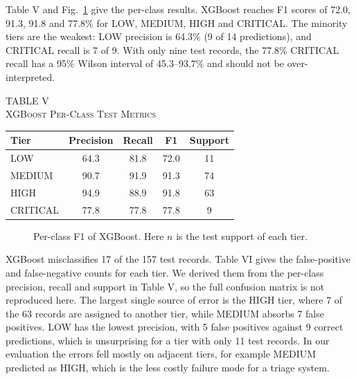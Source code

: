 \documentclass[10pt,twocolumn]{article}
\newcommand{\tcap}[2]{\begin{center}\footnotesize TABLE #1\\[1pt]\scshape #2\end{center}\vspace{-8pt}}
\newcommand{\tnote}[1]{\par\vspace{2pt}{\footnotesize #1\par}}
\begin{document}
Table V and Fig.~\ref{fig:perclass} give the per-class results. XGBoost reaches F1 scores of 72.0, 91.3, 91.8 and 77.8\% for LOW, MEDIUM, HIGH and CRITICAL. The minority tiers are the weakest: LOW precision is 64.3\% (9 of 14 predictions), and CRITICAL recall is 7 of 9. With only nine test records, the 77.8\% CRITICAL recall has a 95\% Wilson interval of 45.3--93.7\% and should not be over-interpreted.

\begin{table}[!t]
\centering
\tcap{V}{XGBoost Per-Class Test Metrics}
\footnotesize
\begin{tabular}{|l|c|c|c|c|}
\hline
\textbf{Tier} & \textbf{Precision} & \textbf{Recall} & \textbf{F1} & \textbf{Support}\\
\hline
LOW & 64.3 & 81.8 & 72.0 & 11\\
\hline
MEDIUM & 90.7 & 91.9 & 91.3 & 74\\
\hline
HIGH & 94.9 & 88.9 & 91.8 & 63\\
\hline
CRITICAL & 77.8 & 77.8 & 77.8 & 9\\
\hline
\end{tabular}
\tnote{Scores are in percent.}
\end{table}

\begin{figure}[!t]
\centering
{}
\caption{Per-class F1 of XGBoost. Here $n$ is the test support of each tier.}
\label{fig:perclass}
\end{figure}

XGBoost misclassifies 17 of the 157 test records. Table VI gives the false-positive and false-negative counts for each tier. We derived them from the per-class precision, recall and support in Table V, so the full confusion matrix is not reproduced here. The largest single source of error is the HIGH tier, where 7 of the 63 records are assigned to another tier, while MEDIUM absorbs 7 false positives. LOW has the lowest precision, with 5 false positives against 9 correct predictions, which is unsurprising for a tier with only 11 test records. In our evaluation the errors fell mostly on adjacent tiers, for example MEDIUM predicted as HIGH, which is the less costly failure mode for a triage system.
\end{document}
